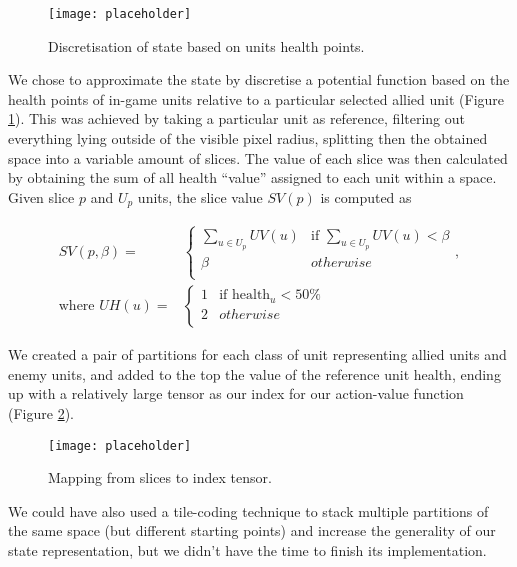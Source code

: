 \begin{figure}[h]
    \centering
    \texttt{[image: placeholder]}
    \caption{Discretisation of state based on units health points.}
    \label{fig:discrete_state}
\end{figure}

We chose to approximate the state by discretise a potential function
\citep{diebelthrun} based on the health points of in-game units relative to a
particular selected allied unit (Figure \ref{fig:discrete_state}). This was
achieved by taking a particular unit as reference, filtering out everything
lying outside of the visible pixel radius, splitting then the obtained space
into a variable amount of slices. The value of each slice was then calculated by
obtaining the sum of all health ``value'' assigned to each unit within a space.
Given slice $p$ and $U_p$ units, the slice value $SV(p)$ is computed as

\begin{equation}
  \begin{aligned}
    SV(p, \beta) = & 
    \begin{cases}
      \sum_{u \in U_p}{UV(u)} & \text{if } \sum_{u \in U_p}{UV(u)} < \beta \\
      \beta & otherwise\\
    \end{cases}, \\ \text{where } 
    UH(u) = &
    \begin{cases}
      1 & \text{if } \text{health}_u < 50\%\\
      2 & otherwise \\
    \end{cases} 
  \end{aligned}
\end{equation}

We created a pair of partitions for each class of unit representing allied units
and enemy units, and added to the top the value of the reference unit health,
ending up with a relatively large tensor as our index for our action-value
function (Figure \ref{fig:array_state}).

\begin{figure}[h]
    \centering
    \texttt{[image: placeholder]}
    \caption{Mapping from slices to index tensor.}
    \label{fig:array_state}
\end{figure}

We could have also used a tile-coding technique\citep{stone_sutton_keepaway} to
stack multiple partitions of the same space (but different starting points) and
increase the generality of our state representation, but we didn't have the time
to finish its implementation.

